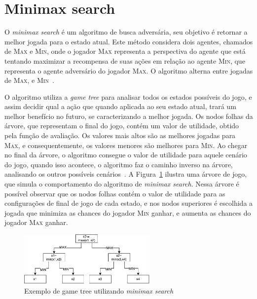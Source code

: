 \section{Minimax search}
\label{sec:minimax}

O \textit{minimax search} é um algoritmo de busca adversária, seu objetivo é retornar a melhor jogada para o estado atual. 
Este método considera dois agentes, chamados de \textsc{Max} e \textsc{Min}, onde o jogador \textsc{Max} representa a perspectiva do agente que está tentando maximizar a recompensa de suas ações em relação ao agente \textsc{Min}, que representa o agente adversário do jogador \textsc{Max}. 
O algoritmo alterna entre jogadas de \textsc{Max}, e \textsc{Min}~\cite[Capítulo 5]{intelligence2003modern}. 

O algoritmo utiliza a \textit{game tree} para analisar todos os estados possíveis do jogo, e assim decidir qual a ação que quando aplicada ao seu estado atual, trará um melhor benefício no futuro, se caracterizando a melhor jogada. 
Os nodos folhas da árvore, que representam o final do jogo, contém um valor de utilidade, obtido pela função de avaliação. 
Os valores mais altos são as melhores jogadas para \textsc{Max}, e consequentemente, os valores menores são melhores para \textsc{Min}. 
Ao chegar no final da árvore, o algoritmo consegue o valor de utilidade para aquele cenário do jogo, quando isso acontece, o algoritmo faz o caminho inverso na árvore, analisando os outros possíveis cenários~\cite[Capítulo 5]{intelligence2003modern}. 
A Figura~\ref{fig:gametree} ilustra uma árvore de jogo, que simula o comportamento do algoritmo de \textit{minimax search}. Nessa árvore é possível observar que os nodos folhas contém o valor de utilidade para as configurações de final de jogo de cada estado, e nos nodos superiores é escolhida a jogada que minimiza as chances do jogador \textsc{Min} ganhar, e aumenta as chances do jogador \textsc{Max} ganhar.

\begin{figure}[ht]
	\centering
	\includegraphics[width=0.6\textwidth]{fig/gametree.pdf}
	\caption{Exemplo de game tree utilizando \textit{minimax search}}
	\label{fig:gametree}
\end{figure} 

